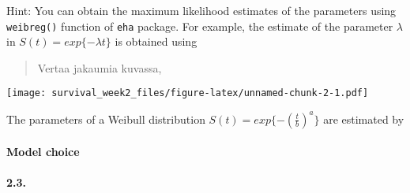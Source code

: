 \documentclass[]{article}
\newenvironment{Shaded}{\begin{snugshade}}{\end{snugshade}}
\newcommand{\KeywordTok}[1]{\textcolor[rgb]{0.13,0.29,0.53}{\textbf{#1}}}
\newcommand{\DataTypeTok}[1]{\textcolor[rgb]{0.13,0.29,0.53}{#1}}
\newcommand{\DecValTok}[1]{\textcolor[rgb]{0.00,0.00,0.81}{#1}}
\newcommand{\StringTok}[1]{\textcolor[rgb]{0.31,0.60,0.02}{#1}}
\newcommand{\OperatorTok}[1]{\textcolor[rgb]{0.81,0.36,0.00}{\textbf{#1}}}
\newcommand{\NormalTok}[1]{#1}
\let\oldparagraph\paragraph
\renewcommand{\paragraph}[1]{\oldparagraph{#1}\mbox{}}
\begin{document}
Hint: You can obtain the maximum likelihood estimates of the parameters
using \texttt{weibreg()} function of \texttt{eha} package. For example,
the estimate of the parameter \(\lambda\) in
\(S(t) = exp\{−\lambda t\}\) is obtained using

\begin{quote}
Vertaa jakaumia kuvassa,
\end{quote}

\begin{Shaded}
\end{Shaded}

\texttt{[image: survival\_week2\_files/figure-latex/unnamed-chunk-2-1.pdf]}

The parameters of a Weibull distribution
\(S(t) = exp\{−(\frac{t}{b})^a\}\) are estimated by

\begin{Shaded}
\end{Shaded}

\paragraph{Model choice}\label{model-choice}

\paragraph{2.3.}\label{section-5}
\end{document}
